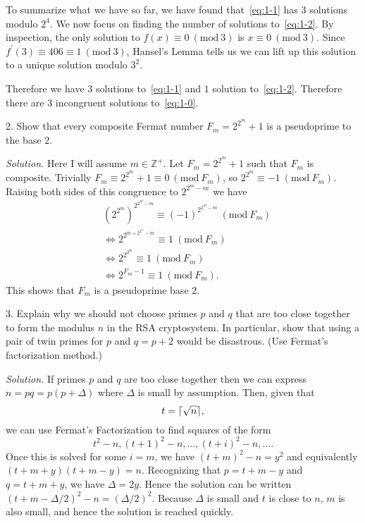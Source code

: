 \documentclass{article}
\newcommand{\Mod}[1]{\ (\mathrm{mod}\ #1)}
\DeclarePairedDelimiter{\ceil}{\lceil}{\rceil}
\newcommand{\Z}{\mathbb{Z}}
\begin{document}
To summarize what we have so far, we have found that~\eqref{eq:1-1} has
$3$ solutions modulo $2^4$. We now focus on finding the number of solutions
to~\eqref{eq:1-2}. By inspection, the only solution to $f(x) \equiv 0 \Mod 3$
is $x \equiv 0 \Mod 3$. Since $f^\prime(3) \equiv 406 \equiv 1 \Mod 3$,
Hansel's Lemma tells us we can lift up this solution to a unique solution
modulo $3^2$.

Therefore we have $3$ solutions to~\eqref{eq:1-1} and $1$ solution
to~\eqref{eq:1-2}. Therefore there are $3$ incongruent solutions
to~\eqref{eq:1-0}.

\newpage

2. Show that every composite Fermat number $F_m = 2^{2^m} + 1$ is a
pseudoprime to the base $2$.

\textit{Solution.}
Here I will assume $m \in \Z^+$. Let $F_m= 2^{2^m} + 1$ such that $F_m$
is composite. Trivially $F_m \equiv 2^{2^m} + 1 \equiv 0 \Mod{F_m}$,
so $2^{2^m} \equiv -1 \Mod{F_m}$. Raising both sides of this congruence
to $2^{2^m - m}$ we have
%
\begin{align*}
    &(2^{2^m})^{2^{2^m - m}} \equiv (-1)^{2^{2^m - m}} \Mod{F_m} \\
    &\iff 2^{2^{m + 2^{2^m} - m}} \equiv 1 \Mod{F_m} \\
    &\iff 2^{2^{2^m}} \equiv 1 \Mod{F_m} \\
    &\iff 2^{F_m - 1} \equiv 1 \Mod{F_m}
    .
\end{align*}
%
This shows that $F_m$ is a pseudoprime base $2$.

\newpage

3. Explain why we should not choose primes $p$ and $q$ that are too close
together to form the modulus $n$ in the RSA cryptosystem. In particular,
show that using a pair of twin primes for $p$ and $q = p + 2$ would be
disastrous. (Use Fermat's factorization method.)

\textit{Solution.}
If primes $p$ and $q$ are too close together then
we can express $n = pq = p (p + \Delta)$
where $\Delta$ is small by assumption. Then, given that
%
\begin{equation*}
    t = \ceil{\sqrt{n}}
    ,
\end{equation*}
%
we can use Fermat's Factorization to find squares of the form
%
\begin{equation*}
    t^2 - n, (t + 1)^2 - n, \ldots, (t + i)^2 - n, \ldots
    .
\end{equation*}
%
Once this is solved for some $i = m$, we have $(t + m)^2 - n = y^2$
and equivalently $(t + m + y)(t + m - y) = n$. Recognizing that
$p = t + m - y$ and $q = t + m + y$, we have $\Delta = 2 y$.
Hence the solution can be written
$(t + m - \Delta / 2)^2 - n = (\Delta / 2)^2$. Because $\Delta$ is small
and $t$ is close to $n$, $m$ is also small, and hence the solution is
reached quickly.
\end{document}
